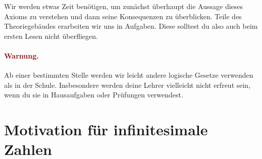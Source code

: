 \documentclass[twoside]{../zirkelblatt}
\theoremstyle{definition}
\theoremstyle{plain}
\theoremstyle{remark}
\begin{document}
Wir werden etwas Zeit benötigen, um zunächst überhaupt die Aussage dieses Axioms zu
verstehen und dann seine Konsequenzen zu überblicken. Teile des Theoriegebäudes
erarbeiten wir uns in Aufgaben. Diese solltest du also auch beim ersten Lesen
nicht überfliegen.

\paragraph{\textcolor{darkred}{Warnung.}} Ab einer bestimmten Stelle werden wir
leicht andere logische Gesetze verwenden als in der Schule. Insbesondere werden
deine Lehrer vielleicht nicht erfreut sein, wenn du sie in Hausaufgaben oder
Prüfungen verwendest.

\section{Motivation für infinitesimale Zahlen}
\end{document}
